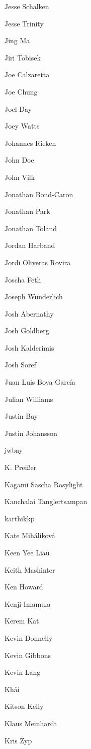 \begin{DoxyItemize}
\item Jesse Schalken
\item Jesse Trinity
\item Jing Ma
\item Jiri Tobisek
\item Joe Calzaretta
\item Joe Chung
\item Joel Day
\item Joey Watts
\item Johannes Rieken
\item John Doe
\item John Vilk
\item Jonathan Bond-\/\+Caron
\item Jonathan Park
\item Jonathan Toland
\item Jordan Harband
\item Jordi Oliveras Rovira
\item Joscha Feth
\item Joseph Wunderlich
\item Josh Abernathy
\item Josh Goldberg
\item Josh Kalderimis
\item Josh Soref
\item Juan Luis Boya García
\item Julian Williams
\item Justin Bay
\item Justin Johansson
\item jwbay
\item K. Preißer
\item Kagami Sascha Rosylight
\item Kanchalai Tanglertsampan
\item karthikkp
\item Kate Miháliková
\item Keen Yee Liau
\item Keith Mashinter
\item Ken Howard
\item Kenji Imamula
\item Kerem Kat
\item Kevin Donnelly
\item Kevin Gibbons
\item Kevin Lang
\item Khải
\item Kitson Kelly
\item Klaus Meinhardt
\item Kris Zyp

\end{DoxyItemize}
